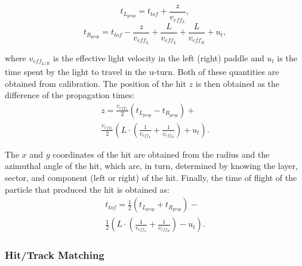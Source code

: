 \begin{equation}
t_{L_{prop}} = t_{tof} + \frac{z}{v_{eff_L}},
\end{equation}
\begin{equation}
t_{R_{prop}} = t_{tof} - \frac{z}{v_{eff_L}} + \frac{L}{v_{eff_L}} + \frac{L}{v_{eff_R}} + u_t,
\end{equation}

\noindent
where $v_{eff_{L/R}}$ is the effective light velocity in the left (right) paddle and $u_t$ is the time spent by the light
to travel in the u-turn. Both of these quantities are obtained from calibration. The position of the hit $z$ is then
obtained as the difference of the propagation times:
\begin{multline}
  z = \frac{v_{eff_L}}{2} \left(t_{L_{prop}} - t_{R_{prop}} \right) + \\ \frac{v_{eff_L}}{2} \left( L \cdot \left(\frac{1}{v_{eff_L}}
  + \frac{1}{v_{eff_R}}\right) + u_t \right).
\end{multline}

The $x$ and $y$ coordinates of the hit are obtained from the radius and the azimuthal angle of the hit, which are,
in turn, determined by knowing the layer, sector, and component (left or right) of the hit. Finally, the time of flight
of the particle that produced the hit is obtained as:
\begin{multline}
  t_{tof} = \frac{1}{2} \left( t_{L_{prop}} + t_{R_{prop}} \right) - \\
  \frac{1}{2} \left( L \cdot \left( \frac{1}{v_{eff_L}} + \frac{1}{v_{eff_R}} \right)
  -u_t \right).
\end{multline}

\subsubsection{Hit/Track Matching}


